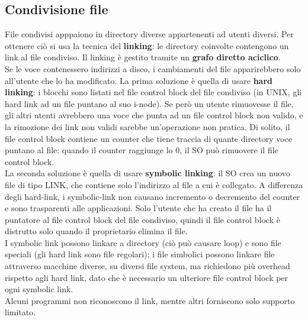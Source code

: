 \documentclass[12pt]{article}
\begin{document}
\subsection{Condivisione file}
File condivisi apppaiono in directory diverse appartenenti ad utenti diversi. Per ottenere ciò si usa la tecnica del
\textbf{linking}: le directory coinvolte contengono un link al file condiviso. Il linking è gestito tramite un 
\textbf{grafo diretto aciclico}.\\
Se le voce contenessero indirizzi a disco, i cambiamenti del file apparirebbero solo all'utente che lo ha modificato.
La prima soluzione è quella di usare \textbf{hard linking}: i blocchi sono listati nel file control block del file 
condiviso (in UNIX, gli hard link ad un file puntano al suo i-node). Se però un utente rimuovesse il file, gli altri
utenti avrebbero una voce che punta ad un file control block non valido, e la rimozione dei link non validi sarebbe
un'operazione non pratica. Di solito, il file control block contiene un counter che tiene traccia di quante directory
voce puntano al file: quando il counter raggiunge lo 0, il SO può rimuovere il file control block.\\
La seconda soluzione è quella di usare \textbf{symbolic linking}: il SO crea un nuovo file di tipo LINK, che contiene 
solo l'indirizzo al file a cui è collegato. A differenza degli hard-link, i symbolic-link non causano incremento o 
decremento del counter e sono trasparenti alle applicazioni. 
Solo l'utente che ha creato il file ha il puntatore al file control block del file condiviso, quindi il file control
block è distrutto solo quando il proprietario elimina il file.\\
I symbolic link possono linkare a directory (ciò può causare loop) e sono file speciali (gli hard link sono file
regolari); i file simbolici possono linkare file attraverso macchine diverse, su diversi file system, ma richiedono
più overhead rispetto agli hard link, dato che è necessario un ulteriore file control block per ogni symbolic link.\\
Alcuni programmi non riconoscono il link, mentre altri forniscono solo supporto limitato.
\end{document}
